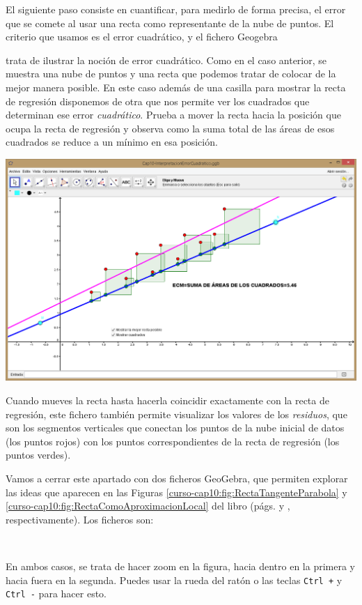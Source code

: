 \documentclass[10pt,a4paper]{article}\usepackage[]{graphicx}\usepackage[]{color}
\begin{document}
El siguiente paso consiste en cuantificar, para medirlo de forma precisa, el error que se comete al usar una recta como representante de la nube de puntos. El criterio que usamos es el error cuadrático, y el fichero Geogebra
\begin{center}
\end{center}
trata de ilustrar la noción de error cuadrático. Como en el caso anterior, se muestra una nube de puntos y una recta que podemos tratar de colocar de la mejor manera posible. En este caso además de una casilla para mostrar la recta de regresión disponemos de otra que nos permite ver los cuadrados que determinan ese error {\em cuadrático}. Prueba a mover la recta hacia la posición que ocupa la recta de regresión y observa como la suma total de las áreas de esos cuadrados se reduce a un mínimo en esa posición.
\begin{center}
    \includegraphics[width=15.6cm]{../fig/Tut10-22.png}
\end{center}
Cuando mueves la recta hasta hacerla coincidir exactamente con la recta de regresión, este fichero también permite visualizar los valores de los {\em residuos}, que son los segmentos verticales que conectan los puntos de la nube inicial de datos (los puntos rojos) con los puntos correspondientes de la recta de regresión (los puntos verdes).

Vamos a cerrar este apartado con dos ficheros GeoGebra, que permiten explorar las ideas que aparecen en las Figuras \ref{curso-cap10:fig:RectaTangenteParabola} y \ref{curso-cap10:fig:RectaComoAproximacionLocal} del libro (págs. \pageref{curso-cap10:fig:RectaTangenteParabola} y \pageref{curso-cap10:fig:RectaComoAproximacionLocal}, respectivamente). Los ficheros son:
\begin{center}
\\
\end{center}
En ambos casos, se trata de hacer zoom en la figura, hacia dentro en la primera y hacia fuera en la segunda. Puedes usar la rueda del ratón o las teclas {\tt Ctrl +} y {\tt Ctrl -} para hacer esto.
\end{document}
